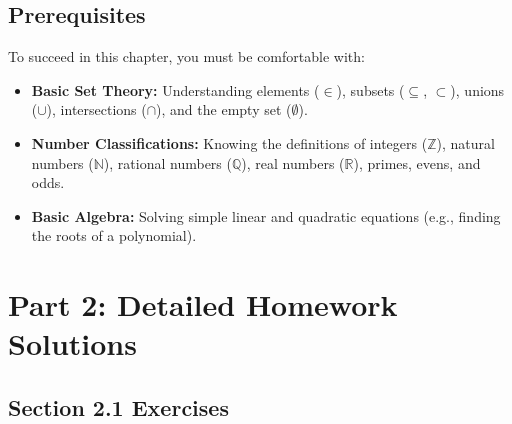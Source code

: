 \documentclass[11pt]{article}
\begin{document}
\subsection{Prerequisites}
To succeed in this chapter, you must be comfortable with:
\begin{itemize}
    \item \textbf{Basic Set Theory:} Understanding elements ($\in$), subsets ($\subseteq$, $\subset$), unions ($\cup$), intersections ($\cap$), and the empty set ($\emptyset$).
    \item \textbf{Number Classifications:} Knowing the definitions of integers ($\mathbb{Z}$), natural numbers ($\mathbb{N}$), rational numbers ($\mathbb{Q}$), real numbers ($\mathbb{R}$), primes, evens, and odds.
    \item \textbf{Basic Algebra:} Solving simple linear and quadratic equations (e.g., finding the roots of a polynomial).
\end{itemize}

\newpage
\section{Part 2: Detailed Homework Solutions}

\subsection{Section 2.1 Exercises}
\end{document}
